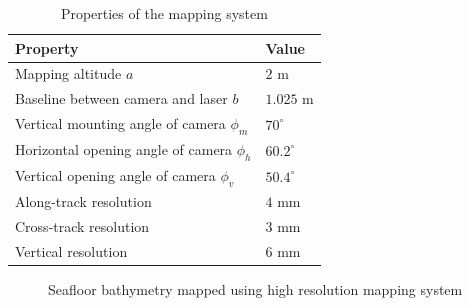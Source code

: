 \begin{table}[!ht]
\centering
\caption{Properties of the mapping system}
\begin{tabular}{  |p{6cm}  p{4cm}| }
\hline
\textbf{Property} & \textbf{Value}\\ \hline 
Mapping altitude $a$ & $2$ m \\
Baseline between camera and laser $b$ & $1.025$ m\\
Vertical mounting angle of camera $\phi_m$ & $70^\circ$ \\
Horizontal opening angle of camera $\phi_h$ & $60.2^{\circ}$\\
Vertical opening angle of camera $\phi_v$ & $50.4^{\circ}$\\
Along-track resolution & $4$ mm\\
Cross-track resolution & $3$ mm\\
Vertical resolution & $6$ mm\\

\hline
\end{tabular}
\label{t:table1}
\end{table}

\begin{figure}[!ht]
\centering
{}\quad
{}
\caption{Seafloor bathymetry mapped using high resolution mapping system}
\end{figure}

